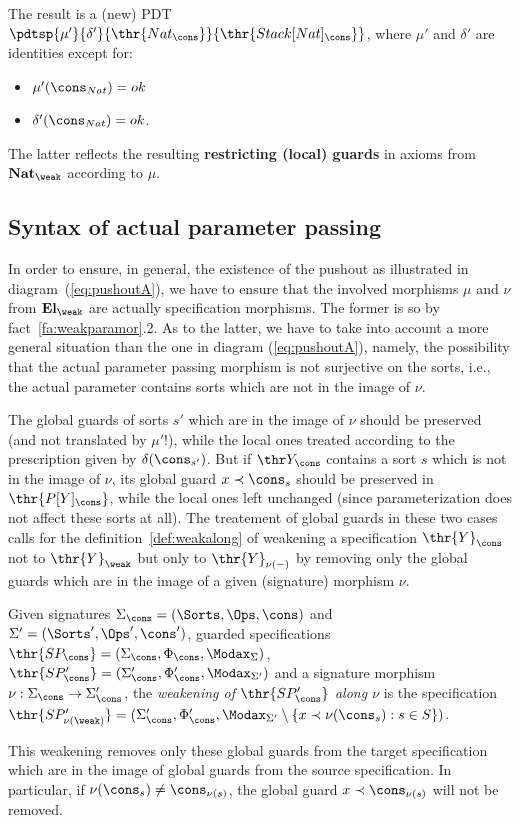 The result is  a (new) PDT
 $\pdtsp{\mu'}{\delta'}{\thr{Nat_\cons}}{\thr{Stack[Nat]_\cons}}$, where
 $\mu'$ and $\delta'$ are identities except for:
	\begin{itemize}\MyLPar
	\item $\mu'(\cons_{Nat}) = ok$
	\item $\delta'(\cons_{Nat}) = ok$.
	\end{itemize}
The latter reflects the resulting {\bf restricting (local) guards} in axioms from ${\bf Nat}_{\weak}$ 
according to $\mu$.

\subsection{Syntax of actual parameter passing}\label{sub:appsyn}
In order to ensure, in general, the existence of the pushout as illustrated in
diagram~(\ref{eq:pushoutA}), we have to ensure that the involved morphisms $\mu$
and $\nu$ from ${\bf El}_\weak$ are actually specification morphisms. The
former is so by fact~\ref{fa:weakparamor}.2. As to the latter, we have to
take into account a more general situation than the one in diagram
(\ref{eq:pushoutA}), namely, the possibility that the actual parameter
passing morphism is not surjective on the sorts, i.e., the actual parameter
contains sorts which are not in the image of $\nu$. 

The global guards of sorts $s'$ which are in the image of $\nu$ should be
preserved (and not translated by $\mu'$!), while the local ones treated
according to the prescription given by $\delta(\cons_{s'})$.
But if $\thr Y_\cons$ contains a sort $s$ which is not in the image of $\nu$, its
global guard $x\prec \cons_s$ should be preserved in $\thr{P[Y]_\cons}$,
while the local ones left unchanged (since parameterization does not affect
these sorts at all).
The treatement of global guards in these two cases calls for the 
definition~\ref{def:weakalong} of weakening a specification
$\thr{Y}_\cons$ not to $\thr{Y}_\weak$ but only to $\thr{Y}_{\nu(-)}$ by removing
only the global guards which are in the image of a given (signature)
morphism $\nu$. 

\begin{definition}\label{def:weakalong}
Given signatures $\Sigma_\cons=(\Sorts,\Ops,\cons)$ and
$\Sigma'=(\Sorts',\Ops',\cons')$, guarded specifications
$\thr{SP_\cons}=(\Sigma_\cons,\Phi_\cons,\Modax_\Sigma)$,
$\thr{SP'_\cons}=(\Sigma'_\cons,\Phi'_\cons,\Modax_{\Sigma'})$ and a
signature morphism $\nu:\Sigma_\cons\to\Sigma'_\cons$, the {\em weakening of
$\thr{SP'_\cons}$ along $\nu$} is the specification $\thr{SP'_{\nu(\weak)}} =
(\Sigma'_\cons,\Phi'_\cons,\Modax_{\Sigma'}\setminus\{x\prec\nu(\cons_s):s\in
S\})$.
\end{definition}
This weakening removes only these global guards from the target specification
which are in the image of global guards from the source specification. In
particular, if $\nu(\cons_s)\not=\cons_{\nu(s)}$, the global guard $x\prec
\cons_{\nu(s)}$ will not be removed.


